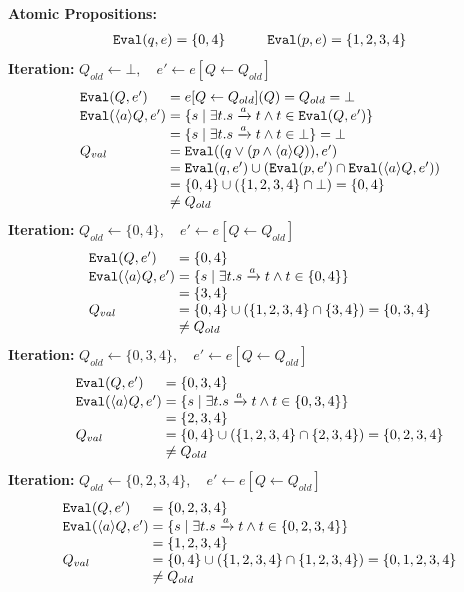 \documentclass[a4paper,11pt]{article}
\theoremstyle{mytheor}
\begin{document}
\noindent \textbf{Atomic Propositions:}
\[
\begin{array}{ll}
  \texttt{Eval}(q, e) = \{0,4\} &\qquad \texttt{Eval}(p, e) = \{1,2,3,4\} \\
\end{array}
\]
\textbf{ Iteration:} 
\(Q_{old} \gets \bot,\quad e'\gets e[Q \gets Q_{old}]\)
\[
\arraycolsep=1.4pt
\begin{array}{ll}
  \Eval(Q, e') 
    &= e[Q \gets Q_{old}](Q) = Q_{old} = \bot \\
  \Eval(\langle a \rangle Q, e') 
    &= \{s \mid \exists t. s \xrightarrow{a} t \wedge t \in \Eval(Q, e')\} \\
    &= \{s \mid \exists t. s \xrightarrow{a} t \wedge t \in \bot\} = \bot\\
  Q_{val}
    &= \Eval((q \vee (p \wedge \langle a \rangle Q)), e')\\
    &= \Eval(q, e') \cup (\Eval(p,e') \cap \Eval(\langle a \rangle Q,e')) \\
    &= \Evalq \cup (\Evalp \cap \bot)=\{0,4\} \\
    &\neq Q_{old}
\end{array}
\]
\textbf{ Iteration:} 
\(Q_{old} \gets \{0,4\},\quad e'\gets e[Q \gets Q_{old}]\)
\[
\arraycolsep=1.4pt
\begin{array}{ll}
  \Eval(Q, e') 
    &= \{0,4\} \\
  \Eval(\langle a \rangle Q, e') 
    &= \{s \mid \exists t. s \xrightarrow{a} t \wedge t \in \{0,4\}\} \\
    &= \{3,4\} \\
  Q_{val}
    &= \Evalq \cup (\Evalp \cap \{3,4\})=\{0,3,4\} \\
    &\neq Q_{old}
\end{array}
\]
\textbf{ Iteration:} 
\(Q_{old} \gets \{0,3,4\},\quad e'\gets e[Q \gets Q_{old}]\)
\[
\arraycolsep=1.4pt
\begin{array}{ll}
  \Eval(Q, e') 
    &= \{0,3,4\} \\
  \Eval(\langle a \rangle Q, e') 
    &= \{s \mid \exists t. s \xrightarrow{a} t \wedge t \in \{0,3,4\}\} \\
    &= \{2,3,4\} \\
  Q_{val}
    &= \Evalq \cup (\Evalp \cap \{2,3,4\}) =\{0,2,3,4\} \\
    &\neq Q_{old}
\end{array}
\]
\textbf{ Iteration:} 
\(Q_{old} \gets \{0,2,3,4\},\quad e'\gets e[Q \gets Q_{old}]\)
\[
\arraycolsep=1.4pt
\begin{array}{ll}
  \Eval(Q, e') 
    &= \{0,2,3,4\} \\
  \Eval(\langle a \rangle Q, e') 
    &= \{s \mid \exists t. s \xrightarrow{a} t \wedge t \in \{0,2,3,4\}\} \\
    &= \{1,2,3,4\} \\
  Q_{val}
    &= \Evalq \cup (\Evalp \cap \{1,2,3,4\}) =\{0,1,2,3,4\} \\
    &\neq Q_{old}
\end{array}
\]
\end{document}

